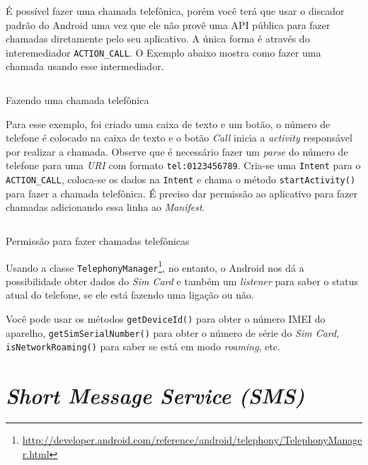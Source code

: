 \documentclass[a4paper,12pt,brazil]{book}
\begin{document}
\begin{singlespace}
		É possível fazer uma chamada telefônica, porém você terá que usar o discador padrão do Android uma vez que ele não provê uma API pública para fazer chamadas diretamente pelo seu aplicativo. A única forma é através do interemediador \texttt{ACTION\_CALL}. O Exemplo abaixo mostra como fazer uma chamada usando esse intermediador.

		\begin{listing}[H]
		\inputminted[linenos=true,fontsize=\small,frame=lines, framesep=2mm, tabsize=2,numbersep=5pt]{java}{src/api/comm/phonecall.java}
		\caption{Fazendo uma chamada telefônica}
		\label{code:phonecall}
		\end{listing} 

		Para esse exemplo, foi criado uma caixa de texto e um botão, o número de telefone é colocado na caixa de texto e o botão \emph{Call} inicia a \emph{activity} responsável por realizar a chamada. Observe que é necessário fazer um \emph{parse} do número de telefone para uma \emph{URI} com formato \texttt{tel:0123456789}. Cria-se uma \texttt{Intent} para o \texttt{ACTION\_CALL}, coloca-se os dados na \texttt{Intent} e chama o método \texttt{startActivity()} para fazer a chamada telefônica. É preciso dar permissão ao aplicativo para fazer chamadas adicionando essa linha ao \emph{Manifest}.
	
		\begin{listing}[H]
		\inputminted[linenos=true,fontsize=\small,frame=lines, framesep=2mm, tabsize=2,numbersep=5pt]{xml}{src/api/comm/phonecall-perm.xml}
		\caption{Permissão para fazer chamadas telefônicas}
		\label{code:phonecall-perm}
		\end{listing} 		

		Usando a classe \texttt{TelephonyManager}\footnote{\href{http://developer.android.com/reference/android/telephony/TelephonyManager.html}{http://developer.android.com/reference/android/telephony/TelephonyManager.html}}, no entanto, o Android nos dá a possibilidade obter dados do \emph{Sim Card} e também um \emph{listener} para saber o status atual do telefone, se ele está fazendo uma ligação ou não.

		Você pode usar os métodos \texttt{getDeviceId()} para obter o número IMEI do aparelho, \texttt{getSimSerialNumber()} para obter o número de série do \emph{Sim Card}, \texttt{isNetworkRoaming()} para saber se está em modo \emph{roaming}, etc.

	\section{\emph{Short Message Service (SMS)}}


\end{singlespace}
\end{document}
